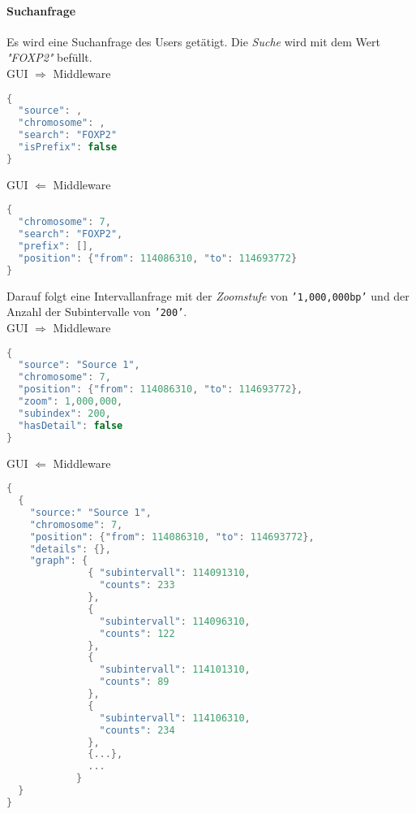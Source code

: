 \paragraph{Suchanfrage} Es wird eine Suchanfrage des Users getätigt. Die \textit{Suche} wird mit dem Wert \textit{"FOXP2"} befüllt.\\
\newline
GUI $\Rightarrow$ Middleware
\begin{lstlisting}[language=c,
commentstyle=\fontsize{12}{14.4}\selectfont,
basicstyle=\ttfamily\fontsize{10}{12}\selectfont, showstringspaces=false]
{
  "source": ,
  "chromosome": ,
  "search": "FOXP2"
  "isPrefix": false
}
\end{lstlisting}
GUI $\Leftarrow$ Middleware
\begin{lstlisting}[language=c,
commentstyle=\fontsize{12}{14.4}\selectfont,
basicstyle=\ttfamily\fontsize{10}{12}\selectfont, showstringspaces=false]
{
  "chromosome": 7,
  "search": "FOXP2",
  "prefix": [],
  "position": {"from": 114086310, "to": 114693772}
}
\end{lstlisting}
Darauf folgt eine Intervallanfrage mit der \textit{Zoomstufe} von \texttt{'1,000,000bp'} und der Anzahl der Subintervalle von \texttt{'200'}.\\
\newline
GUI $\Rightarrow$ Middleware
\begin{lstlisting}[language=c,
commentstyle=\fontsize{12}{14.4}\selectfont,
basicstyle=\ttfamily\fontsize{10}{12}\selectfont, showstringspaces=false]
{
  "source": "Source 1",
  "chromosome": 7,
  "position": {"from": 114086310, "to": 114693772},
  "zoom": 1,000,000,
  "subindex": 200,
  "hasDetail": false
}
\end{lstlisting}
GUI $\Leftarrow$ Middleware
\begin{lstlisting}[language=c,
commentstyle=\fontsize{12}{14.4}\selectfont,
basicstyle=\ttfamily\fontsize{10}{12}\selectfont, showstringspaces=false]
{
  {
    "source:" "Source 1",
    "chromosome": 7,
    "position": {"from": 114086310, "to": 114693772},
    "details": {},
    "graph": {
              { "subintervall": 114091310,
                "counts": 233
              },
              {
                "subintervall": 114096310,
                "counts": 122
              },
              {
                "subintervall": 114101310,
                "counts": 89
              },
              {
                "subintervall": 114106310,
                "counts": 234
              },
              {...},
              ...
            }
  }
}
\end{lstlisting}

